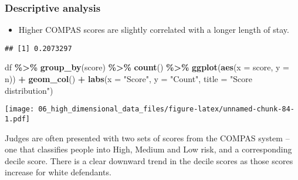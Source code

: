 \documentclass[
]{book}
\newenvironment{Shaded}{\begin{snugshade}}{\end{snugshade}}
\newcommand{\DataTypeTok}[1]{\textcolor[rgb]{0.13,0.29,0.53}{#1}}
\newcommand{\KeywordTok}[1]{\textcolor[rgb]{0.13,0.29,0.53}{\textbf{#1}}}
\newcommand{\NormalTok}[1]{#1}
\newcommand{\OperatorTok}[1]{\textcolor[rgb]{0.81,0.36,0.00}{\textbf{#1}}}
\newcommand{\StringTok}[1]{\textcolor[rgb]{0.31,0.60,0.02}{#1}}
\providecommand{\tightlist}{%
  \setlength{\itemsep}{0pt}\setlength{\parskip}{0pt}}
\begin{document}
\hypertarget{descriptive-analysis}{%
\subsubsection{Descriptive analysis}\label{descriptive-analysis}}

\begin{itemize}
\tightlist
\item
  Higher COMPAS scores are slightly correlated with a longer length of stay.
\end{itemize}

\begin{Shaded}
\end{Shaded}

\begin{verbatim}
## [1] 0.2073297
\end{verbatim}

\begin{Shaded}
\begin{Highlighting}[]
\NormalTok{df }\OperatorTok{\%\textgreater{}\%}
\StringTok{  }\KeywordTok{group\_by}\NormalTok{(score) }\OperatorTok{\%\textgreater{}\%}
\StringTok{  }\KeywordTok{count}\NormalTok{() }\OperatorTok{\%\textgreater{}\%}
\StringTok{  }\KeywordTok{ggplot}\NormalTok{(}\KeywordTok{aes}\NormalTok{(}\DataTypeTok{x =}\NormalTok{ score, }\DataTypeTok{y =}\NormalTok{ n)) }\OperatorTok{+}
\StringTok{    }\KeywordTok{geom\_col}\NormalTok{() }\OperatorTok{+}
\StringTok{    }\KeywordTok{labs}\NormalTok{(}\DataTypeTok{x =} \StringTok{"Score"}\NormalTok{,}
         \DataTypeTok{y =} \StringTok{"Count"}\NormalTok{,}
         \DataTypeTok{title =} \StringTok{"Score distribution"}\NormalTok{)}
\end{Highlighting}
\end{Shaded}

\texttt{[image: 06\_high\_dimensional\_data\_files/figure-latex/unnamed-chunk-84-1.pdf]}

Judges are often presented with two sets of scores from the COMPAS system -- one that classifies people into High, Medium and Low risk, and a corresponding decile score. There is a clear downward trend in the decile scores as those scores increase for white defendants.
\end{document}
